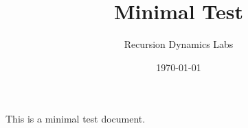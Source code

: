 \documentclass{article}
\title{Minimal Test}
\author{Recursion Dynamics Labs}
\date{\today}
\begin{document}
\maketitle
This is a minimal test document.
\end{document}
